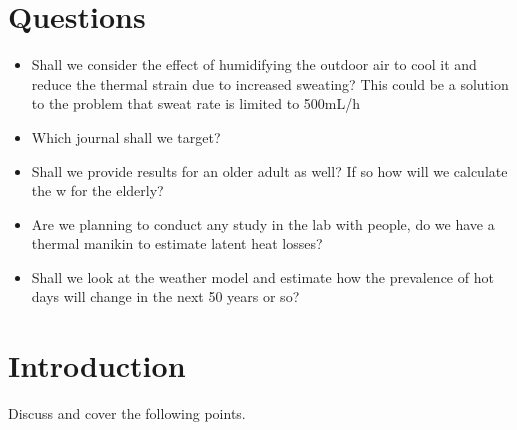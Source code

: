 

\section*{Questions}

\begin{itemize}
    \item Shall we consider the effect of humidifying the outdoor air to cool it and reduce the thermal strain due to increased sweating?
    This could be a solution to the problem that sweat rate is limited to 500mL/h
    \item Which journal shall we target?
    \item Shall we provide results for an older adult as well?
    If so how will we calculate the w for the elderly?
    \item Are we planning to conduct any study in the lab with people, do we have a thermal manikin to estimate latent heat losses?
    \item Shall we look at the weather model and estimate how the prevalence of hot days will change in the next 50 years or so?
\end{itemize}

\section{Introduction}\label{sec:introduction}

Discuss and cover the following points.

